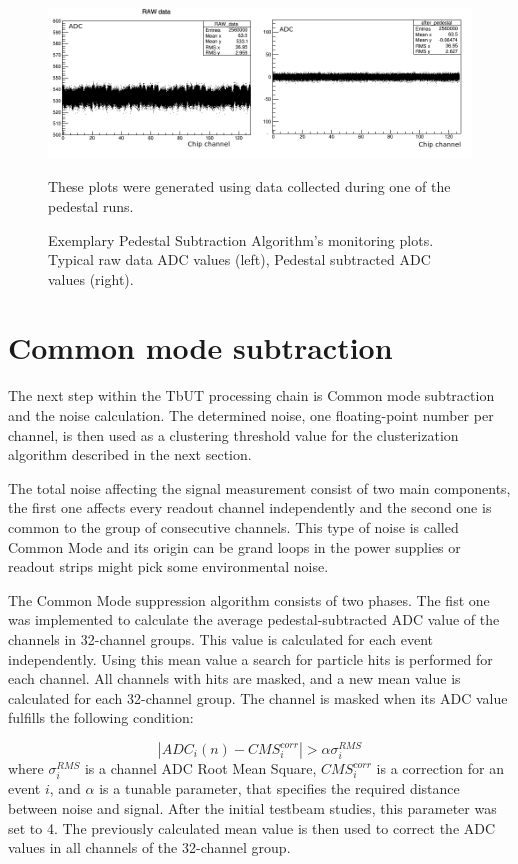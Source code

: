\begin{figure}[h]
\centering
\includegraphics{figures/Pedestal_vs_raw.png}
\caption{Exemplary Pedestal Subtraction Algorithm's monitoring plots. Typical raw data ADC values (left), Pedestal subtracted ADC values
(right).} These plots were generated using data collected during one of the pedestal runs. 
\label{fig:raw vs ped}
\end{figure}


\section{Common mode subtraction}
The next step within the TbUT processing chain is Common mode subtraction and the noise calculation. The determined noise, one floating-point number per channel,  is then used as a clustering threshold value for the clusterization algorithm described in the next section. 


The total noise affecting the signal measurement consist of two main components,  the first one affects every readout channel independently and the second one is common to the group of consecutive channels.  This type of noise is called Common Mode and its origin can be grand loops in the power supplies or readout strips might pick some environmental noise. 

The Common Mode suppression algorithm consists of two phases. The fist one was implemented to calculate the average pedestal-subtracted ADC value of the channels in
32-channel groups. This value is calculated for each event independently. Using this mean value a search for particle hits is performed for each channel. All channels with hits are masked, and a new mean value is calculated for each 32-channel group. The channel is masked when its ADC value fulfills the following condition:

\begin{equation}
    |ADC_{i}(n)-CMS^{corr}_{i}| > \alpha \sigma^{RMS}_{i}
\end{equation}
where $\sigma^{RMS}_{i}$ is a channel ADC Root Mean Square, $CMS^{corr}_{i} $ is a correction for an event $i$, and $\alpha$ is a tunable parameter, that specifies the required distance between noise and signal. After the initial testbeam studies, this parameter was set to 4. 
The previously calculated mean value is then used to correct the ADC values in all channels of the 32-channel group.

